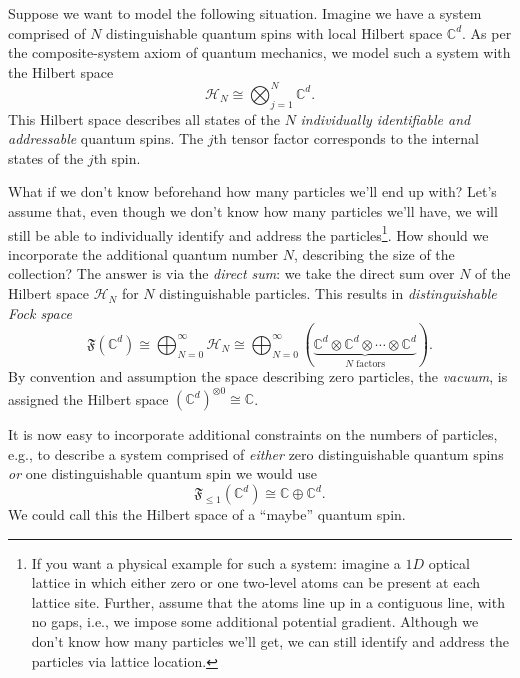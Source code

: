 Suppose we want to model the following situation. Imagine we have a system comprised of $N$ distinguishable quantum spins with local Hilbert space $\mathbb{C}^d$. As per the composite-system axiom of quantum mechanics, we model such a system with the Hilbert space
\begin{equation}
	\mathcal{H}_N \cong \bigotimes_{j=1}^N \mathbb{C}^d.
\end{equation}
This Hilbert space describes all states of the $N$ \emph{individually identifiable and addressable} quantum spins. The $j$th tensor factor corresponds to the internal states of the $j$th spin.

What if we don't know beforehand how many particles we'll end up with? Let's assume that, even though we don't know how many particles we'll have, we will still be able to individually identify and address the particles\footnote{If you want a physical example for such a system: imagine a $1D$ optical lattice in which either zero or one two-level atoms can be present at each lattice site. Further, assume that the atoms line up in a contiguous line, with no gaps, i.e., we impose some additional potential gradient. Although we don't know how many particles we'll get, we can still identify and address the particles via lattice location.}. How should we incorporate the additional quantum number $N$, describing the size of the collection? The answer is via the \emph{direct sum}: we take the direct sum over $N$ of the Hilbert space $\mathcal{H}_N$ for $N$ distinguishable particles. This results in \emph{distinguishable Fock space}
\begin{equation}
	\mathfrak{F}(\mathbb{C}^d) \cong \bigoplus_{N=0}^\infty \mathcal{H}_N\cong \bigoplus_{N=0}^\infty (\underbrace{\mathbb{C}^d\otimes \mathbb{C}^d\otimes \cdots \otimes \mathbb{C}^d}_{\text{$N$ factors}}).
\end{equation}
By convention and assumption the space describing zero particles, the \emph{vacuum}, is assigned the Hilbert space $(\mathbb{C}^d)^{\otimes 0} \cong \mathbb{C}$.

It is now easy to incorporate additional constraints on the numbers of particles, e.g., to describe a system comprised of \emph{either} zero distinguishable quantum spins \emph{or} one distinguishable quantum spin we would use
\begin{equation}
	\mathfrak{F}_{\le 1} (\mathbb{C}^d) \cong \mathbb{C}\oplus \mathbb{C}^d.
\end{equation}
We could call this the Hilbert space of a ``maybe'' quantum spin.

